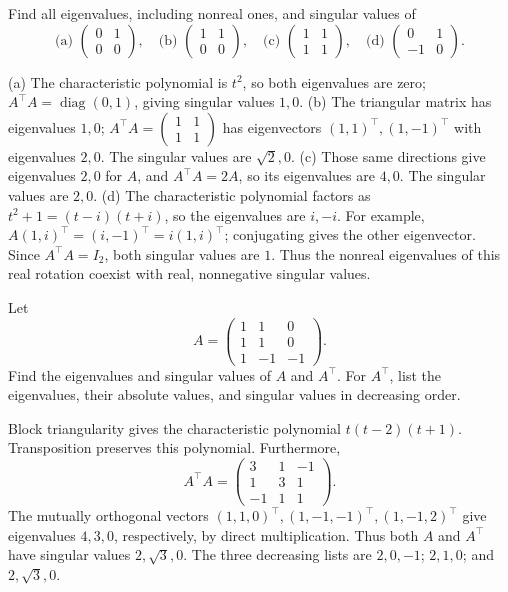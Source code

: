 \begin{problem}\label{ex:10:numerical-values}
Find all eigenvalues, including nonreal ones, and singular values of
\[
\text{(a) }\begin{pmatrix}0&1\\0&0\end{pmatrix},\quad
\text{(b) }\begin{pmatrix}1&1\\0&0\end{pmatrix},\quad
\text{(c) }\begin{pmatrix}1&1\\1&1\end{pmatrix},\quad
\text{(d) }\begin{pmatrix}0&1\\-1&0\end{pmatrix}.
\]
\end{problem}
\begin{solution}
(a) The characteristic polynomial is \(t^2\), so both eigenvalues are
zero; \(A^\top A=\operatorname{diag}(0,1)\), giving singular values \(1,0\).
(b) The triangular matrix has eigenvalues \(1,0\);
\(A^\top A=\begin{pmatrix}1&1\\1&1\end{pmatrix}\) has eigenvectors
\((1,1)^\top,(1,-1)^\top\) with eigenvalues \(2,0\). The singular values
are \(\sqrt2,0\).
(c) Those same directions give eigenvalues \(2,0\) for \(A\), and
\(A^\top A=2A\), so its eigenvalues are \(4,0\). The singular values are \(2,0\).
(d) The characteristic polynomial factors as \(t^2+1=(t-i)(t+i)\),
so the eigenvalues are \(i,-i\). For example,
\(A(1,i)^\top=(i,-1)^\top=i(1,i)^\top\); conjugating gives the other
eigenvector. Since \(A^\top A=I_2\), both singular values are \(1\).
Thus the nonreal eigenvalues of this real rotation coexist with real,
nonnegative singular values.
\end{solution}

\begin{problem}\label{ex:10:transpose-numerical}
Let
\[
A=\begin{pmatrix}1&1&0\\1&1&0\\1&-1&-1\end{pmatrix}.
\]
Find the eigenvalues and singular values of \(A\) and \(A^\top\).
For \(A^\top\), list the eigenvalues, their absolute values, and singular
values in decreasing order.
\end{problem}
\begin{solution}
Block triangularity gives the characteristic polynomial
\(t(t-2)(t+1)\). Transposition preserves this polynomial.
Furthermore,
\[
A^\top A=\begin{pmatrix}3&1&-1\\1&3&1\\-1&1&1\end{pmatrix}.
\]
The mutually orthogonal vectors \((1,1,0)^\top,(1,-1,-1)^\top,
(1,-1,2)^\top\) give eigenvalues \(4,3,0\), respectively, by direct
multiplication. Thus both \(A\) and \(A^\top\) have singular values
\(2,\sqrt3,0\). The three decreasing lists are
\(2,0,-1\); \(2,1,0\); and \(2,\sqrt3,0\).
\end{solution}

